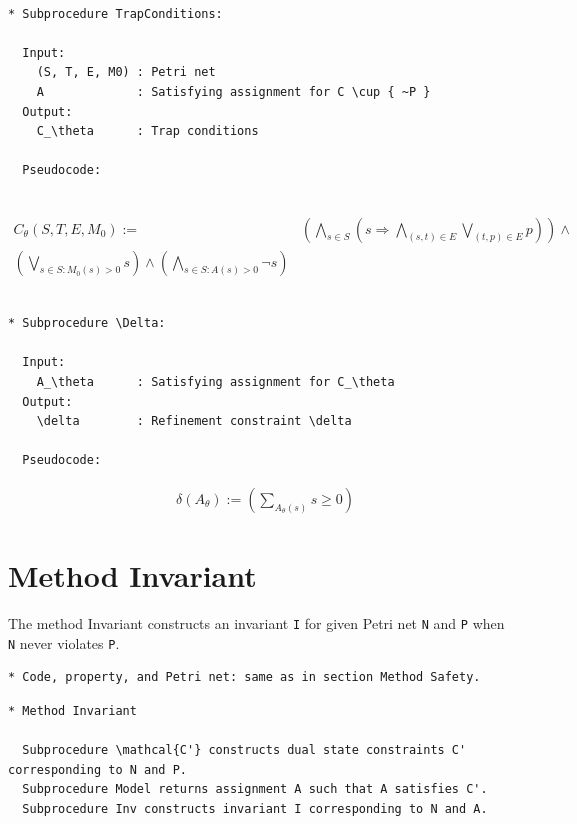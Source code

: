 \documentclass{article}
\begin{document}
\begin{verbatim}

* Subprocedure TrapConditions:

  Input:
    (S, T, E, M0) : Petri net
    A             : Satisfying assignment for C \cup { ~P }
  Output:
    C_\theta      : Trap conditions

  Pseudocode:
  
\end{verbatim}
\begin{align*}
  C_\theta(S, T, E, M_0) :=& \left( \bigwedge_{s \in S} \left( s \Rightarrow
      \bigwedge_{(s, t) \in E} \bigvee_{(t, p) \in E} p
    \right) \right) \land \\
    \left( \bigvee_{s \in S: M_0(s) > 0} s \right) \land
    \left( \bigwedge_{s \in S: A(s) > 0} \neg s \right)
\end{align*}
\begin{verbatim}

* Subprocedure \Delta:

  Input:
    A_\theta      : Satisfying assignment for C_\theta
  Output:
    \delta        : Refinement constraint \delta

  Pseudocode:

\end{verbatim}
\begin{align*}
  & \delta(A_\theta) := \left( \sum_{A_\theta(s)} s \ge 0 \right)
\end{align*}

\iffalse

\newpage
\section{Method Invariant}

The method Invariant constructs an invariant \verb=I= for given Petri net \verb=N= and \verb=P= when \verb=N= never violates \verb=P=.

\begin{verbatim}
* Code, property, and Petri net: same as in section Method Safety.
\end{verbatim}

\begin{verbatim}
* Method Invariant

  Subprocedure \mathcal{C'} constructs dual state constraints C' corresponding to N and P.
  Subprocedure Model returns assignment A such that A satisfies C'.
  Subprocedure Inv constructs invariant I corresponding to N and A.
\end{verbatim}
\end{document}
